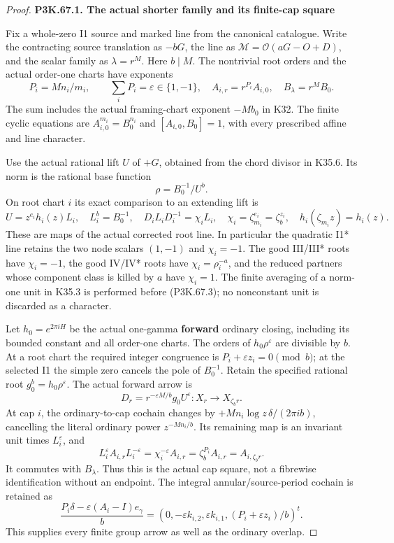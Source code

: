 \begin{proof}
\par

\medskip\noindent\textbf{P3K.67.1. The actual shorter family and its finite-cap square}

\par\nobreak

Fix a whole-zero I1 source and marked line from the canonical catalogue.
Write the contracting source translation as \(-bG\), the line as
\(\mathcal M=\mathcal O(aG-O+D)\), and the scalar family as
\(\lambda=r^M\). Here \(b\mid M\). The nontrivial root orders and the
actual order-one charts have exponents
\[
 P_i=Mn_i/m_i,\qquad \sum_iP_i=\varepsilon\in\{1,-1\},
 \quad A_{i,r}=r^{P_i}A_{i,0},\quad B_\lambda=r^MB_0.
 \tag{P3K.67.1}
\]
The sum includes the actual framing-chart exponent \(-Mb_0\) in K32.
The finite cyclic equations are \(A_{i,0}^{m_i}=B_0^{n_i}\) and
\([A_{i,0},B_0]=1\), with every prescribed affine and line character.

Use the actual rational lift \(U\) of \(+G\), obtained from the chord
divisor in K35.6. Its norm is the rational base function
\[
 \rho=B_0^{-1}/U^b.
 \tag{P3K.67.2}
\]
On root chart \(i\) its exact comparison to an extending lift is
\[
 U=z^{e_i}h_i(z)L_i,\quad L_i^b=B_0^{-1},\quad
 D_iL_iD_i^{-1}=\chi_iL_i,\quad
 \chi_i=\zeta_{m_i}^{e_i}=\zeta_b^{z_i},\quad
 h_i(\zeta_{m_i}z)=h_i(z).
 \tag{P3K.67.3}
\]
These are maps of the actual corrected root line. In particular the
quadratic I1* line retains the two node scalars \((1,-1)\) and
\(\chi_i=-1\). The good III/III* roots have \(\chi_i=-1\), the good
IV/IV* roots have \(\chi_i=\rho_i^{-a}\), and the reduced partners
whose component class is killed by \(a\) have \(\chi_i=1\). The finite
averaging of a norm-one unit in K35.3 is performed before (P3K.67.3); no
nonconstant unit is discarded as a character.

Let \(h_0=e^{2\pi iH}\) be the actual one-gamma \textbf{forward} ordinary
closing, including its bounded constant and all order-one charts.
The orders of \(h_0\rho^\varepsilon\) are divisible by \(b\).
At a root chart the required integer congruence is
\(P_i+\varepsilon z_i=0\pmod b\); at the selected I1 the simple
zero cancels the pole of \(B_0^{-1}\). Retain the specified rational
root \(g_0^b=h_0\rho^\varepsilon\). The actual forward arrow is
\[
 D_r=r^{-\varepsilon M/b}g_0U^\varepsilon:
 X_r\longrightarrow X_{\zeta_b r}.
 \tag{P3K.67.4}
\]
At cap \(i\), the ordinary-to-cap cochain changes by
\(+Mn_i\log z\,\delta/(2\pi ib)\), cancelling the literal ordinary
power \(z^{-Mn_i/b}\). Its remaining map is an invariant unit times
\(L_i^\varepsilon\), and
\[
 L_i^\varepsilon A_{i,r}L_i^{-\varepsilon}
   =\chi_i^{-\varepsilon}A_{i,r}
   =\zeta_b^{P_i}A_{i,r}=A_{i,\zeta_b r}.
 \tag{P3K.67.5}
\]
It commutes with \(B_\lambda\). Thus this is the actual cap square,
not a fibrewise identification without an endpoint. The integral
annular/source-period cochain is retained as
\[
 \frac{P_i\delta-\varepsilon(A_i-I)e_\gamma}{b}
 =(0,-\varepsilon k_{i,2},\varepsilon k_{i,1},
                    (P_i+\varepsilon z_i)/b)^t.
 \tag{P3K.67.6}
\]
This supplies every finite group arrow as well as the ordinary overlap.


\end{proof}
